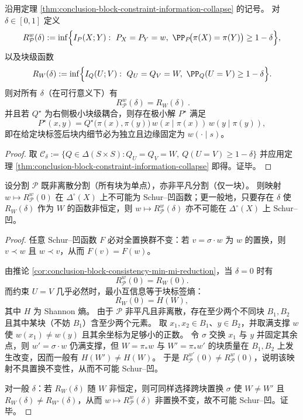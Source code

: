 \begin{corollary}[块一致性约束的最小互信息函数与极小解结构]\label{cor:conclusion-block-consistency-min-mi-reduction}
沿用定理 \ref{thm:conclusion-block-constraint-information-collapse} 的记号。
对 \(\delta\in[0,1]\) 定义
\[
R_{\mathcal P}^w(\delta)
:=\inf\Bigl\{ I_P(X;Y):\ P_X=P_Y=w,\ \PP_P\!\bigl(\pi(X)=\pi(Y)\bigr)\ge 1-\delta\Bigr\},
\]
以及块级函数
\[
R_W(\delta)
:=\inf\Bigl\{ I_Q(U;V):\ Q_U=Q_V=W,\ \PP_Q(U=V)\ge 1-\delta\Bigr\}.
\]
则对所有 \(\delta\)（在可行意义下）有
\[
\boxed{\ R_{\mathcal P}^w(\delta)=R_W(\delta)\ }.
\]
并且若 \(Q^\star\) 为右侧极小块级耦合，则存在极小解 \(P^\star\) 满足
\[
P^\star(x,y)
=Q^\star\!\bigl(\pi(x),\pi(y)\bigr)\,w(x\mid \pi(x))\,w(y\mid \pi(y)),
\]
即在给定块标签后块内细节必为独立且边缘固定为 \(w(\cdot\mid s)\)。
\end{corollary}
\begin{proof}
取 \(\mathcal C_\delta:=\{Q\in\Delta(S\times S): Q_U=Q_V=W,\ Q(U=V)\ge 1-\delta\}\) 并应用定理 \ref{thm:conclusion-block-constraint-information-collapse} 即得。证毕。
\end{proof}

\begin{proposition}\label{prop:conclusion-block-consistency-not-schur-concave}
设分割 \(\mathcal P\) 既非离散分割（所有块为单点），亦非平凡分割（仅一块）。
则映射
\(
w\mapsto R_{\mathcal P}^w(0)
\)
在 \(\Delta^\circ(X)\) 上不可能为 Schur--凹函数；更一般地，只要存在 \(\delta\) 使 \(R_W(\delta)\) 作为 \(W\) 的函数非恒定，则
\(
w\mapsto R_{\mathcal P}^w(\delta)
\)
亦不可能在 \(\Delta^\circ(X)\) 上 Schur--凹。
\end{proposition}
\begin{proof}
任意 Schur--凹函数 \(F\) 必对全置换群不变：若 \(v=\sigma\cdot w\) 为 \(w\) 的置换，则 \(v\prec w\) 且 \(w\prec v\)，从而 \(F(v)=F(w)\)。
\par
由推论 \ref{cor:conclusion-block-consistency-min-mi-reduction}，当 \(\delta=0\) 时有
\[
R_{\mathcal P}^w(0)=R_W(0).
\]
而约束 \(U=V\) 几乎必然时，最小互信息等于块标签熵：
\[
R_W(0)=H(W),
\]
其中 \(H\) 为 Shannon 熵。
由于 \(\mathcal P\) 非平凡且非离散，存在至少两个不同块 \(B_1,B_2\) 且其中某块（不妨 \(B_1\)）含至少两个元素。
取 \(x_1,x_2\in B_1\)、\(y\in B_2\)，并取满支撑 \(w\) 使 \(w(x_1)\neq w(y)\) 且其余坐标为足够小的正数。
令 \(\sigma\) 交换 \(x_1\) 与 \(y\) 并固定其余点，则 \(w'=\sigma\cdot w\) 仍满支撑，但 \(W=\pi_*w\) 与 \(W'=\pi_*w'\) 的块质量在 \(B_1,B_2\) 上发生改变，因而一般有 \(H(W')\neq H(W)\)。
于是
\(
R_{\mathcal P}^{w'}(0)\neq R_{\mathcal P}^{w}(0)
\)，说明该映射不具置换不变性，从而不可能 Schur--凹。
\par
对一般 \(\delta\)：若 \(R_W(\delta)\) 随 \(W\) 非恒定，则可同样选择跨块置换 \(\sigma\) 使 \(W\neq W'\) 且 \(R_W(\delta)\neq R_{W'}(\delta)\)，从而 \(w\mapsto R_{\mathcal P}^w(\delta)\) 非置换不变，故不可能 Schur--凹。证毕。
\end{proof}

\endinput

